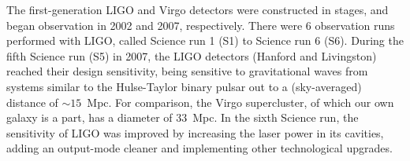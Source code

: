 % 
The first-generation LIGO and Virgo detectors were constructed in stages, and
began observation in 2002 and 2007, respectively. There were 6 observation 
runs performed with LIGO, called Science run 1 (S1) to Science run 6 (S6). 
During the fifth Science run (S5) in 2007, the LIGO detectors (Hanford and
Livingston) reached their design sensitivity, being sensitive to gravitational 
waves from systems similar to the Hulse-Taylor binary pulsar out to a
(sky-averaged) distance of $\sim 15$~Mpc.
For comparison, the Virgo supercluster, of which our own galaxy is a part, has
a diameter of $33$~Mpc. In the sixth Science run, the sensitivity of LIGO 
was improved by increasing the laser power in its cavities, adding 
an output-mode cleaner and implementing other technological upgrades. 
